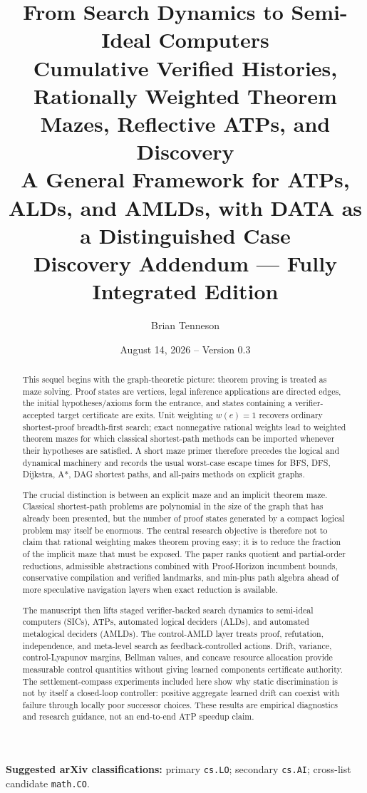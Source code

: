 \documentclass[11pt]{article}
\title{\textbf{From Search Dynamics to Semi-Ideal Computers}\\[0.4em]
\Large Cumulative Verified Histories, Rationally Weighted Theorem Mazes, Reflective ATPs, and Discovery\\[0.6em]
\large A General Framework for ATPs, ALDs, and AMLDs, with DATA as a Distinguished Case\\[0.4em]
\normalsize Discovery Addendum --- Fully Integrated Edition}
\author{Brian Tenneson}
\date{August 14, 2026 -- Version 0.3}
\theoremstyle{remark}
\begin{document}
\maketitle

\begin{center}
\textbf{Suggested arXiv classifications:} primary \texttt{cs.LO}; secondary \texttt{cs.AI}; cross-list candidate \texttt{math.CO}.
\end{center}

\begin{abstract}
This sequel begins with the graph-theoretic picture: theorem proving is treated as maze solving. Proof states are vertices, legal inference applications are directed edges, the initial hypotheses/axioms form the entrance, and states containing a verifier-accepted target certificate are exits. Unit weighting $w(e)=1$ recovers ordinary shortest-proof breadth-first search; exact nonnegative rational weights lead to weighted theorem mazes for which classical shortest-path methods can be imported whenever their hypotheses are satisfied. A short maze primer therefore precedes the logical and dynamical machinery and records the usual worst-case escape times for BFS, DFS, Dijkstra, A*, DAG shortest paths, and all-pairs methods on explicit graphs.

The crucial distinction is between an explicit maze and an implicit theorem maze. Classical shortest-path problems are polynomial in the size of the graph that has already been presented, but the number of proof states generated by a compact logical problem may itself be enormous. The central research objective is therefore not to claim that rational weighting makes theorem proving easy; it is to reduce the fraction of the implicit maze that must be exposed. The paper ranks quotient and partial-order reductions, admissible abstractions combined with Proof-Horizon incumbent bounds, conservative compilation and verified landmarks, and min-plus path algebra ahead of more speculative navigation layers when exact reduction is available.

The manuscript then lifts staged verifier-backed search dynamics to semi-ideal computers (SICs), ATPs, automated logical deciders (ALDs), and automated metalogical deciders (AMLDs). The control-AMLD layer treats proof, refutation, independence, and meta-level search as feedback-controlled actions. Drift, variance, control-Lyapunov margins, Bellman values, and concave resource allocation provide measurable control quantities without giving learned components certificate authority. The settlement-compass experiments included here show why static discrimination is not by itself a closed-loop controller: positive aggregate learned drift can coexist with failure through locally poor successor choices. These results are empirical diagnostics and research guidance, not an end-to-end ATP speedup claim.


\end{abstract}
\end{document}
